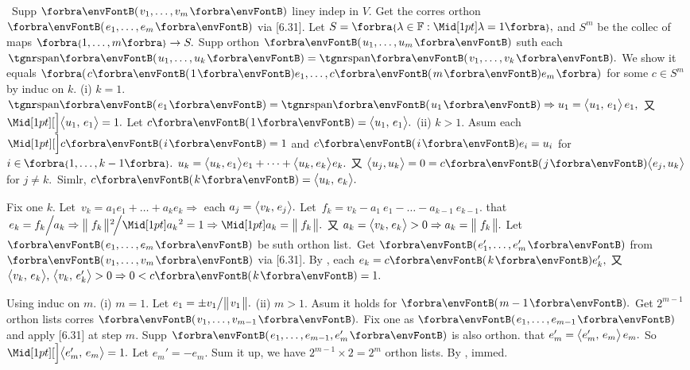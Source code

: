 \BulletPointX\Tips \,\,\,Supp $\Par{v_1,\dots,v_m}$ liney indep in $V.$ Get the corres orthon $\Par{e_1,\dots,e_m}$ via [6.31].\TextB{}
{\IndentTips}Let $S=\Bra{\lambda\in\Fbb:\aMid{\lambda}=1},$ and $S^m$ be the collec of maps $\Bra{1,\dots,m}\rightarrow S.$\TextB{}
{\IndentTips}Supp orthon $\Par{u_1,\dots,u_m}$ suth each $\Span{u_1,\dots,u_k}=\Span{v_1,\dots,v_k}.$\vspace{1pt}\TextB{}
{\IndentTips}We show it equals $\BigBigPar{c\Par{1}e_1,\dots,c\Par{m}e_m}$ for some $c\in S^m$ by induc on $k.$\vspace{1pt}\TextB{}
{\IndentTips}(i) $k=1.$ $\Span{e_1}=\Span{u_1}\Rightarrow u_1=\Ang{u_1,\,e_1}\,e_1,$ 又 $\innerA{u_1,\,e_1}=1.$ Let $c\Par{1}=\Ang{u_1,\,e_1}.$\vspace{1pt}\TextB{}
{\IndentTips}(ii) $k>1.$ Asum each $\aXMid{c\Par{i}}=1$ and $c\Par{i}e_i=u_i$ for $i\in\;\!\!\Bra{1,\dots,k-1}.$\vspace{1pt}\TextB{}
{\IndentTips\Hii}$u_k=\big\langle{}u_k,\:\!e_1{}\big\rangle\:\!e_1+\dots+\big\langle{}u_k,\:\!e_k{}\big\rangle\:\!e_k.$ 又 $\Ang{u_j,u_k}=0=c\Par{j}\Ang{e_j,u_k}$ for $j\neq k.$ \,Simlr, $c\Par{k}=\Ang{u_k,\,e_k}.$
\SepLine

Fix one $k.$ Let \,$v_k=a_1e_1+\dots+a_ke_k\Rightarrow$ each $a_j=\big\langle{}v_k,\;\!e_j{}\big\rangle.$ Let \,$f_k=v_k-a_1\:\!e_1-\dots-a_{k-1}\:\!e_{k-1}.$\vspace{1pt}\parSol{}
\NOTICE that $\,e_k=f_k\Big/\;\!\!a_k\Rightarrow\Dvertsq{\,f_k}\!\Big/\aMidsq{a_k}=1\Rightarrow\aMid{a_k}=\Dvert{\,f_k}.$ 又 $a_k=\big\langle{}v_k,\;\!e_k{}\big\rangle>0\Rightarrow a_k=\big\Vert\hspace{1pt}{}\,f_k{}\hspace{1pt}\big\Vert.$\PfEnd\vspace{4pt}\parSol{}
\Or Let $\Par{e_1,\dots,e_m}$ be suth orthon list. \,Get $\Par{e_1',\dots,e_m'}$ from $\Par{v_1,\dots,v_m}$ via [6.31].\vspace{1pt}\parSol{}
By \TIPS, each $e_k=c\Par{k}e_k',$ 又 $\Ang{v_k,\,e_k},\,\Ang{v_k,\,e_k'}>0\Rightarrow 0<c\Par{k}=1.$\PfEnd
\SepLine

Using induc on $m.$ (i) $m=1.$ Let $e_1=\pm v_1\big/\big\Vert\hspace{1pt}{}v_1{}\hspace{1pt}\big\Vert.$ (ii) $m>1.$ Asum it holds for $\Par{m-1}.$\vspace{1pt}\parSol{}
Get $2^{m-1}$ orthon lists corres $\Par{v_1,\dots,v_{m-1}}.$ Fix one as $\Par{e_1,\dots,e_{m-1}}$ and apply [6.31] at step $m.$\vspace{2pt}\parSol{}
Supp $\Par{e_1,\dots,e_{m-1},e_m'}$ is also orthon. \NOTICE that $e_m'=\big\langle{}e_m',\,e_m{}\big\rangle\,e_m.$ \;So $\innerA{e_m',\,e_m}=1.$\vspace{2pt}\parSol{}
Let $e_m'=-e_m.$ Sum it up, we have $2^{m-1}\times 2=2^m$ orthon lists. \qquad\Or By \TIPS, immed.\PfEnd
\SepLine

